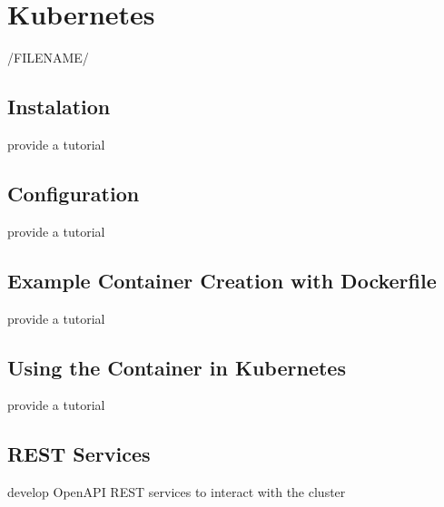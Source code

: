 \chapter{Kubernetes}

/FILENAME/


\section{Instalation}

\begin{exercise}
provide a tutorial 
\end{exercise}

\section{Configuration}

\begin{exercise}
provide a tutorial 
\end{exercise}

\section{Example Container Creation with Dockerfile}

\begin{exercise}
provide a tutorial 
\end{exercise}

\section{Using the Container in Kubernetes}

\begin{exercise}
provide a tutorial 
\end{exercise}

\section{REST Services}

\begin{exercise}
develop OpenAPI REST services to interact with the cluster
\end{exercise}

